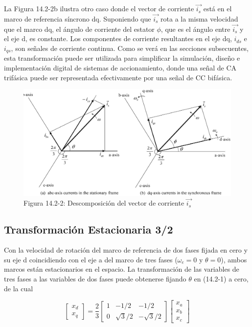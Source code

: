 \documentclass[letterpaper,12pt]{article} %
\begin{document}
La Figura 14.2-2b ilustra otro caso donde el vector de corriente \( \vec{i_s} \) está en el marco de referencia síncrono dq. Suponiendo que \( \vec{i_s} \) rota a la misma velocidad que el marco dq, el ángulo de corriente del estator \( \phi \), que es el ángulo entre \( \vec{i_s} \) y el eje d, es constante. Los componentes de corriente resultantes en el eje dq, \( i_{ds} \) e \( i_{qs} \), son señales de corriente continua. Como se verá en las secciones subsecuentes, esta transformación puede ser utilizada para simplificar la simulación, diseño e implementación digital de sistemas de accionamiento, donde una señal de CA trifásica puede ser representada efectivamente por una señal de CC bifásica.

\begin{figure}[ht]
    \centering
    \includegraphics[width=\textwidth]{graficos/img02.jpg} 
    \caption{Figura 14.2-2: Descomposición del vector de corriente \( \vec{i_s} \)}
    \label{fig:14.2-2}
\end{figure}
\FloatBarrier

\subsection{Transformación Estacionaria 3/2}

Con la velocidad de rotación del marco de referencia de dos fases fijada en cero y su eje d coincidiendo con el eje a del marco de tres fases (\(\omega_e = 0\) y \(\theta = 0\)), ambos marcos están estacionarios en el espacio. La transformación de las variables de tres fases a las variables de dos fases puede obtenerse fijando \(\theta\) en (14.2-1) a cero, de la cual

\[
\begin{bmatrix}
x_d \\
x_q 
\end{bmatrix} 
= \frac{2}{3} 
\begin{bmatrix}
1 & -1/2 & -1/2 \\
0 & \sqrt{3}/2 & -\sqrt{3}/2
\end{bmatrix}
\begin{bmatrix}
x_a \\
x_b \\
x_c 
\end{bmatrix} \tag{14.2-6}
\]
\end{document}

